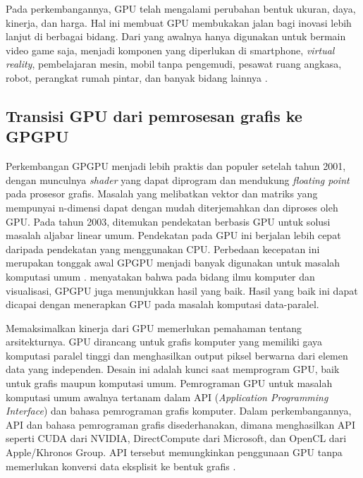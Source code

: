 Pada perkembangannya, GPU telah mengalami perubahan bentuk ukuran, daya,
kinerja, dan harga. Hal ini membuat GPU membukakan jalan bagi inovasi lebih
lanjut di berbagai bidang. Dari yang awalnya hanya digunakan untuk bermain
video game saja, menjadi komponen yang diperlukan di smartphone, \emph{virtual
	reality}, pembelajaran mesin, mobil tanpa pengemudi, pesawat ruang angkasa,
robot, perangkat rumah pintar, dan banyak bidang lainnya
\citep{businesswireHistoryGPUInception2023}.

\subsection{Transisi GPU dari pemrosesan grafis ke GPGPU}

Perkembangan GPGPU menjadi lebih praktis dan populer setelah tahun 2001, dengan
munculnya \emph{shader} yang dapat diprogram dan mendukung \emph{floating point} pada
prosesor grafis. Masalah yang melibatkan vektor dan matriks yang mempunyai
n-dimensi dapat dengan mudah diterjemahkan dan diproses oleh GPU. Pada tahun
2003, ditemukan pendekatan berbasis GPU untuk solusi masalah aljabar linear
umum. Pendekatan pada GPU ini berjalan lebih cepat daripada pendekatan yang
menggunakan CPU. Perbedaan kecepatan ini merupakan tonggak awal GPGPU menjadi
banyak digunakan untuk masalah komputasi umum
\citep{wikipediaGeneralpurposeComputingGraphics2023}.
\cite{pharrGPUGemsProgramming2005} menyatakan bahwa pada bidang ilmu komputer
dan visualisasi, GPGPU juga menunjukkan hasil yang baik. Hasil yang baik ini
dapat dicapai dengan menerapkan GPU pada masalah komputasi data-paralel.

Memaksimalkan kinerja dari GPU memerlukan pemahaman tentang arsitekturnya. GPU
dirancang untuk grafis komputer yang memiliki gaya komputasi paralel tinggi dan
menghasilkan output piksel berwarna dari elemen data yang independen. Desain
ini adalah kunci saat memprogram GPU, baik untuk grafis maupun komputasi umum.
Pemrograman GPU untuk masalah komputasi umum awalnya tertanam dalam API
(\emph{Application Programming Interface}) dan bahasa pemrograman grafis
komputer. Dalam perkembangannya, API dan bahasa pemrograman grafis
disederhanakan, dimana menghasilkan API seperti CUDA dari NVIDIA, DirectCompute
dari Microsoft, dan OpenCL dari Apple/Khronos Group. API tersebut memungkinkan
penggunaan GPU tanpa memerlukan konversi data eksplisit ke bentuk grafis
\citep{pharrGPUGemsProgramming2005}.

